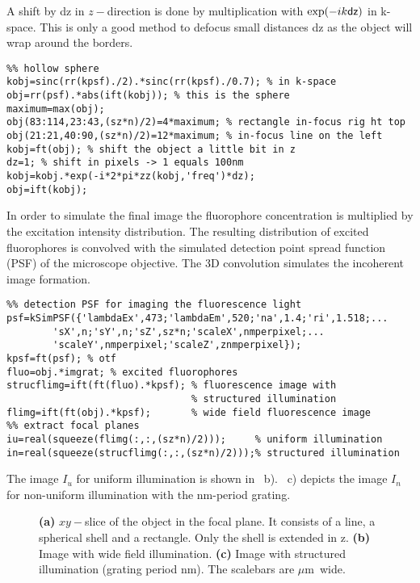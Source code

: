 A shift by {\sf dz} in $z-$direction is done by multiplication with
$\exp(-ik{\sf dz})$ in k-space. This is only a good method to defocus
small distances {\sf dz} as the object will wrap around the borders.

\begin{lstlisting}
%% hollow sphere
kobj=sinc(rr(kpsf)./2).*sinc(rr(kpsf)./0.7); % in k-space
obj=rr(psf).*abs(ift(kobj)); % this is the sphere
maximum=max(obj);
obj(83:114,23:43,(sz*n)/2)=4*maximum; % rectangle in-focus rig ht top
obj(21:21,40:90,(sz*n)/2)=12*maximum; % in-focus line on the left
kobj=ft(obj); % shift the object a little bit in z
dz=1; % shift in pixels -> 1 equals 100nm
kobj=kobj.*exp(-i*2*pi*zz(kobj,'freq')*dz);
obj=ift(kobj);
\end{lstlisting}
In order to simulate the final image the fluorophore concentration is
multiplied by the excitation intensity distribution. The resulting
distribution of excited fluorophores is convolved with the simulated
detection point spread function (PSF)   of the
microscope objective. The 3D convolution simulates the incoherent
image formation.
\begin{lstlisting}
%% detection PSF for imaging the fluorescence light
psf=kSimPSF({'lambdaEx',473;'lambdaEm',520;'na',1.4;'ri',1.518;...
        'sX',n;'sY',n;'sZ',sz*n;'scaleX',nmperpixel;...
        'scaleY',nmperpixel;'scaleZ',znmperpixel});
kpsf=ft(psf); % otf
fluo=obj.*imgrat; % excited fluorophores
strucflimg=ift(ft(fluo).*kpsf); % fluorescence image with 
                                % structured illumination
flimg=ift(ft(obj).*kpsf);       % wide field fluorescence image
%% extract focal planes
iu=real(squeeze(flimg(:,:,(sz*n)/2)));     % uniform illumination
in=real(squeeze(strucflimg(:,:,(sz*n)/2)));% structured illumination
\end{lstlisting}
The image $I_u$ for uniform illumination is shown in
~b). ~c) depicts the image $I_n$
for non-uniform illumination with the \unit[600]{nm}-period grating.
\begin{figure}[!htb]
  \centering


  \caption{{\bf(a)} $xy-$slice of the object in the focal plane. It
    consists of a line, a spherical shell and a rectangle. Only the
    shell is extended in z. {\bf(b)} Image with wide field
    illumination. {\bf(c)} Image with structured illumination (grating
    period \unit[600]{nm}).  The scalebars are \unit[2]{$\mu$m}
    wide. }
  \label{fig:input}
\end{figure}
